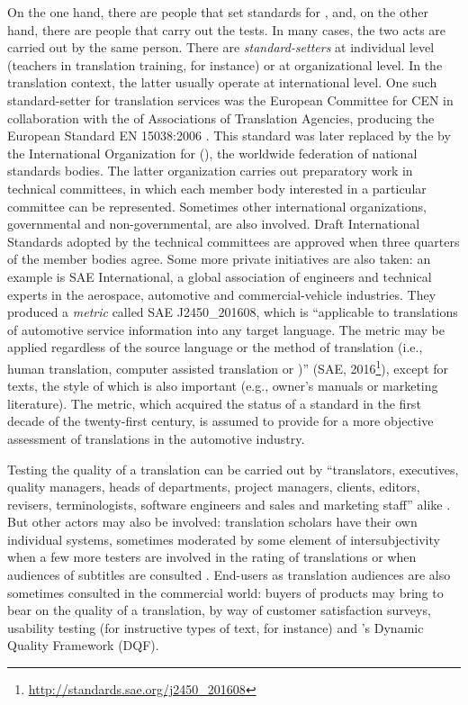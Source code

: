 \documentclass[output=paper]{langsci/langscibook}
\begin{document}
On the one hand, there are people that set standards for , and, on the other hand, there are people that carry out the tests. In many cases, the two acts are carried out by the same person. There are \textit{standard-setters} at individual level (teachers in translation training, for instance) or at organizational level. In the translation context, the latter usually operate at international level. One such standard-setter for translation services was the European Committee for  CEN in collaboration with the  of Associations of Translation Agencies, producing the European Standard EN 15038:2006 \nocite{EN2006}. This standard was later replaced by the \citet{ISO2015} by the International Organization for  (\citeauthor{ISO2015}), the worldwide federation of national standards bodies. The latter organization carries out preparatory work in technical committees, in which each member body interested in a particular committee can be represented. Sometimes other international organizations, governmental and non-governmental, are also involved. Draft International Standards adopted by the technical committees are approved when three quarters of the member bodies agree. Some more private initiatives are also taken: an example is SAE International, a global association of engineers and technical experts in the aerospace, automotive and commercial-vehicle industries. They produced a \textit{ metric} called SAE J2450\_201608, which is ``applicable to translations of automotive service information into any target language. The metric may be applied regardless of the source language or the method of translation (i.e., human translation, computer assisted translation or )'' (SAE, 2016\footnote{\url{http://standards.sae.org/j2450_201608}}), except for texts, the style of which is also important (e.g., owner's manuals or marketing literature). The metric, which acquired the status of a standard in the first decade of the twenty-first century, is assumed to provide for a more objective assessment of translations in the automotive industry. 

Testing the quality of a translation can be carried out by ``translators, executives, quality managers, heads of departments, project managers, clients, editors, revisers, terminologists, software engineers and sales and marketing staff'' alike \citep[3]{Drugan2013}. But other actors may also be involved: translation scholars have their own individual systems, sometimes moderated by some element of intersubjectivity when a few more testers are involved in the rating of translations or when audiences of subtitles are consulted \citep{Delia2014}. End-users as translation audiences are also sometimes consulted in the commercial world: buyers of products may bring to bear on the quality of a translation, by way of customer satisfaction surveys, usability testing (for instructive types of text, for instance) and \citeauthor{TAUS2015}'s Dynamic Quality Framework (DQF). 
\end{document}
